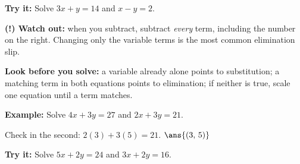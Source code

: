 \documentclass[12pt]{article}
\begin{document}
\begin{tryitbox}
\textbf{Try it:} \quad Solve $3x + y = 14$ and $x - y = 2$.\\[2pt]
\end{tryitbox}

\begin{watchoutbox}
\textbf{(!) Watch out:} when you subtract, subtract \emph{every} term,
including the number on the right. Changing only the variable terms is the
most common elimination slip.
\end{watchoutbox}


\begin{formulabox}
\textbf{Look before you solve:} a variable already alone points to
substitution; a matching term in both equations points to elimination; if
neither is true, scale one equation until a term matches.
\end{formulabox}

\begin{examplebox}
\textbf{Example:} \quad Solve $4x + 3y = 27$ and $2x + 3y = 21$.

Check in the second: $2(3) + 3(5) = 21$. \quad $\ans{(3,\, 5)}$
\end{examplebox}

\begin{tryitbox}
\textbf{Try it:} \quad Solve $5x + 2y = 24$ and $3x + 2y = 16$.\\[2pt]
\end{tryitbox}
\end{document}
